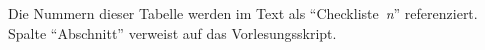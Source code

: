 Die Nummern dieser Tabelle werden im Text als \enquote{Checkliste~\emph{n}} referenziert. Spalte \enquote{Abschnitt} verweist auf das Vorlesungsskript.

